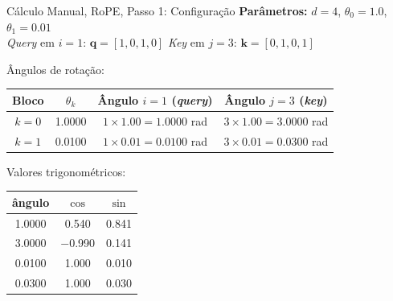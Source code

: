\documentclass[aspectratio=169, xcolor=dvipsnames]{beamer}
\begin{document}
  \begin{frame}{Cálculo Manual, RoPE, Passo 1: Configuração}
    \textbf{Parâmetros:} $d = 4$, \; $\theta_0 = 1.0$, \; $\theta_1 = 0.01$\\
    \textit{Query} em $i=1$: $\mathbf{q} = [1, 0, 1, 0]$ \qquad \textit{Key} em $j=3$: $\mathbf{k} = [0, 1, 0, 1]$

    \vspace{0.3em}
    Ângulos de rotação:

    {\small
    \begin{tabular}{cccc}
      \toprule
      Bloco & $\theta_k$ & Ângulo $i{=}1$ (\textit{query}) & Ângulo $j{=}3$ (\textit{key}) \\
      \midrule
      \rowcolor{CellGreen} $k{=}0$ & 1.0000 & $1 \times 1.00 = 1.0000$ rad & $3 \times 1.00 = 3.0000$ rad \\
      \rowcolor{CellGreen} $k{=}1$ & 0.0100 & $1 \times 0.01 = 0.0100$ rad & $3 \times 0.01 = 0.0300$ rad \\
      \bottomrule
    \end{tabular}}

    \vspace{0.3em}
    Valores trigonométricos:

    {\small
    \begin{tabular}{ccc}
      \toprule
      ângulo & $\cos$ & $\sin$ \\
      \midrule
      1.0000 & 0.540 & 0.841 \\
      3.0000 & $-$0.990 & 0.141 \\
      0.0100 & 1.000 & 0.010 \\
      0.0300 & 1.000 & 0.030 \\
      \bottomrule
    \end{tabular}}
  \end{frame}
\end{document}
